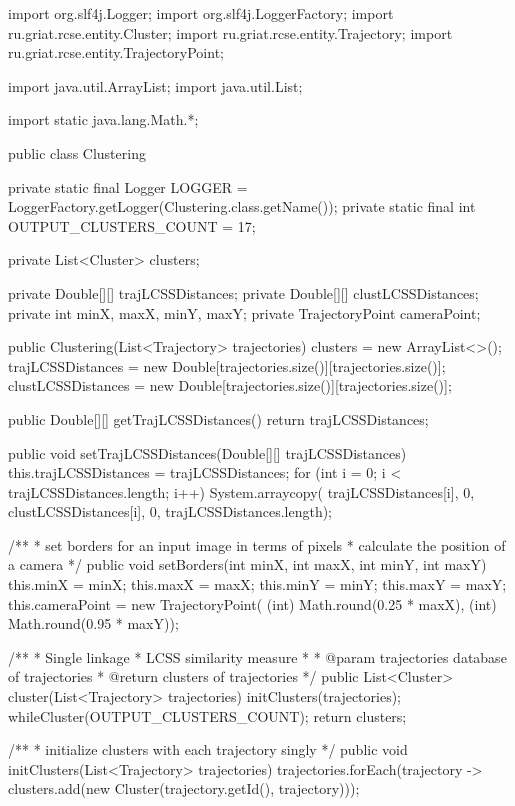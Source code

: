 import org.slf4j.Logger;
import org.slf4j.LoggerFactory;
import ru.griat.rcse.entity.Cluster;
import ru.griat.rcse.entity.Trajectory;
import ru.griat.rcse.entity.TrajectoryPoint;

import java.util.ArrayList;
import java.util.List;

import static java.lang.Math.*;

public class Clustering {

    private static final Logger LOGGER = LoggerFactory.getLogger(Clustering.class.getName());
    private static final int OUTPUT_CLUSTERS_COUNT = 17;

    private List<Cluster> clusters;

    private Double[][] trajLCSSDistances;
    private Double[][] clustLCSSDistances;
    private int minX, maxX, minY, maxY;
    private TrajectoryPoint cameraPoint;

    public Clustering(List<Trajectory> trajectories) {
        clusters = new ArrayList<>();
        trajLCSSDistances = new Double[trajectories.size()][trajectories.size()];
        clustLCSSDistances = new Double[trajectories.size()][trajectories.size()];
    }

    public Double[][] getTrajLCSSDistances() {
        return trajLCSSDistances;
    }

    public void setTrajLCSSDistances(Double[][] trajLCSSDistances) {
        this.trajLCSSDistances = trajLCSSDistances;
        for (int i = 0; i < trajLCSSDistances.length; i++) {
            System.arraycopy(
            		trajLCSSDistances[i], 0, 
            		clustLCSSDistances[i], 0, 
            		trajLCSSDistances.length);
        }
    }

    /**
	* set borders for an input image in terms of pixels
	* calculate the position of a camera
	*/	
    public void setBorders(int minX, int maxX, int minY, int maxY) {
    		this.minX = minX; this.maxX = maxX;
    		this.minY = minY; this.maxY = maxY;
	    	this.cameraPoint = new TrajectoryPoint(
	    			(int) Math.round(0.25 * maxX), 
	    			(int) Math.round(0.95 * maxY));
    }

    /**
     * Single linkage
     * LCSS similarity measure
     *
     * @param trajectories  database of trajectories
     * @return 				clusters of trajectories
     */
    public List<Cluster> cluster(List<Trajectory> trajectories) {
        initClusters(trajectories);
        whileCluster(OUTPUT_CLUSTERS_COUNT);
        return clusters;
    }

    /**
	* initialize clusters with each trajectory singly
	*/
    public void initClusters(List<Trajectory> trajectories) {
        trajectories.forEach(trajectory ->
                clusters.add(new Cluster(trajectory.getId(), trajectory)));
    }

}
